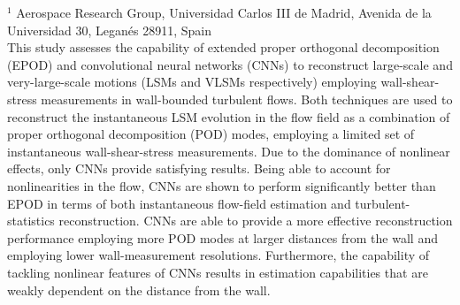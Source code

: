 %
%
%
%
%
%
%
\paperaffiliation
{%
  $^1$ Aerospace Research Group, Universidad Carlos III de Madrid, Avenida de la Universidad 30, Leganés 28911, Spain\\
}%
%
%
%
%
%
%
%
%
%
%
%
\papersummary%
{%
	This study assesses the capability of extended proper orthogonal decomposition (EPOD) and convolutional neural networks (CNNs) to reconstruct large-scale and very-large-scale motions (LSMs and VLSMs respectively) employing wall-shear-stress measurements in wall-bounded turbulent flows.
	Both techniques are used to reconstruct the instantaneous LSM evolution in the flow field as a combination of proper orthogonal decomposition (POD) modes, employing a limited set of instantaneous wall-shear-stress measurements.
	Due to the dominance of nonlinear effects, only CNNs provide satisfying results.
	Being able to account for nonlinearities in the flow, CNNs are shown to perform significantly better than EPOD in terms of both instantaneous flow-field estimation and turbulent-statistics reconstruction.
	CNNs are able to provide a more effective reconstruction performance employing more POD modes at larger distances from the wall and employing lower wall-measurement resolutions.
	Furthermore, the capability of tackling nonlinear features of CNNs results in estimation capabilities that are weakly dependent on the distance from the wall.
}%
%
\graphicspath{{paper1/}}%
%
%
%
